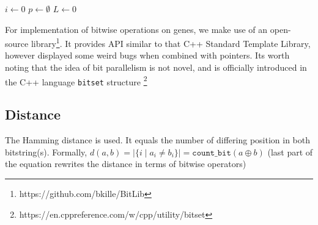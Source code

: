 \documentclass[runningheads]{llncs}
\begin{document}
\begin{algorithm}[htb]
    \caption{$\texttt{bit\_traversal}$: traverse through set bits of a bitstring} \label{alg:gene_iterate}
    $i \gets 0$\;
    $p \gets \emptyset$\;
    $L \gets 0$ 
\end{algorithm}

For implementation of bitwise operations on genes, we make use of an open-source library\footnote{https://github.com/bkille/BitLib}. It provides API similar to that C++ Standard Template Library, however displayed some weird bugs when combined with pointers. It\textquotesingle s worth noting that the idea of bit parallelism is not novel, and is officially introduced in the C++ language \texttt{bitset} structure \footnote{https://en.cppreference.com/w/cpp/utility/bitset}

\subsection*{Distance} The Hamming distance is used. It equals the number of differing position in both bitstring(s). Formally, $d(a,b) = |\{i \mid a_i \neq b_i \}| = \texttt{count\_bit}(a \oplus b)$ (last part of the equation rewrites the distance in terms of bitwise operators)  

\end{document}
